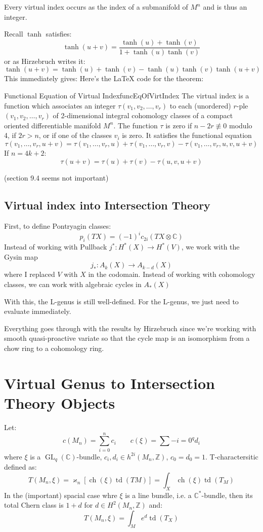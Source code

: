\documentclass{book}
\newcommand{\C}{{\mathbb{C}}}
\newcommand{\Z}{{\mathbb{Z}}}
\newcommand{\ch}{{\operatorname{ch}}}
\newcommand{\td}{{\operatorname{td}}}
\newcommand{\GL}{{\operatorname{GL}}}
\begin{document}
Every virtual index occurs as the index of a submanifold of $M^n$ and is thus an integer.

Recall $\tanh$ satisfies:
\[
  \tanh(u+v) = \frac{\tanh(u) + \tanh(v)}{1  +\tanh(u)\tanh(v)}
\]
or as Hirzebruch writes it:
\[
  \tanh(u+v) = \tanh(u) + \tanh(v) - \tanh(u)\tanh(v)\tanh(u+v)
\]
This immediately gives:
Here's the LaTeX code for the theorem:

\begin{thm}{Functional Equation of Virtual Index}{funcEqOfVirtIndex}
The virtual index is a function which associates an integer $\tau(v_1, v_2, \ldots, v_r)$ to each (unordered)
$r$-ple $(v_1, v_2, \ldots, v_r)$ of 2-dimensional integral cohomology classes of a compact oriented
differentiable manifold $M^n$. The function $\tau$ is zero if $n-2r \not\equiv 0$ modulo 4, if $2r > n$, or if
one of the classes $v_i$ is zero. It satisfies the functional equation
\[
    \tau(v_1,\ldots,v_r,u+v) = \tau(v_1,\ldots,v_r,u) + \tau(v_1,\ldots,v_r,v) - \tau(v_1,\ldots,v_r,u,v,u+v)
\]
If $n = 4k+2$:
\[
  \tau(u+v) = \tau(u) + \tau(v) - \tau(u,v,u+v)
\]
\end{thm}

(section 9.4 seems not important)


\subsection{Virtual index into Intersection Theory}
First, to define Pontryagin classes:
\[
  p_i(TX) = (-1)^i c_{2i}(TX \otimes \C)
\]
Instead of working with Pullback $j^*: H^*(X) \to H^*(V)$, we work with the Gysin map
\[
  j_*: A_k(X) \to A_{k-d}(X)
\]
where I replaced $V$ with $X$ in the codomain. Instead of working with cohomology classes, we can work with
algebraic cycles in $A_*(X)$

With this, the L-genus is still well-defined. For the L-genus, we just need to evaluate immediately.

Everything goes through with the results by Hirzebruch since we're working with smooth quasi-proactive
variate so that the cycle map is an isomorphism from a chow ring to a cohomology ring.

\section{Virtual Genus to Intersection Theory Objects}

Let:
\[
  c(M_n) = \sum_{i=0}^n c_i \qquad c(\xi) = \sum-{i=0}^q d_i
\]
where $\xi$ is a $\GL_q(\C)$-bundle, $c_i, d_i \in h^{2i}(M_n, \Z)$, $c_0 = d_0 = 1$. T-charactersitic defined
as:
\[
  T(M_n, \xi) = \varkappa_n [\ch(\xi) \td(TM)] = \int_X \ch(\xi)\td(T_M)
\]
In the (important) spacial case whre $\xi$ is a line bundle, i.e. a $\C^*$-bundle, then its total Chern class is
$1+d$ for $d \in H^2(M_n, \Z)$ and:
\[
  T(M_n, \xi) = \int_M e^d\td(T_X)
\]
\end{document}
